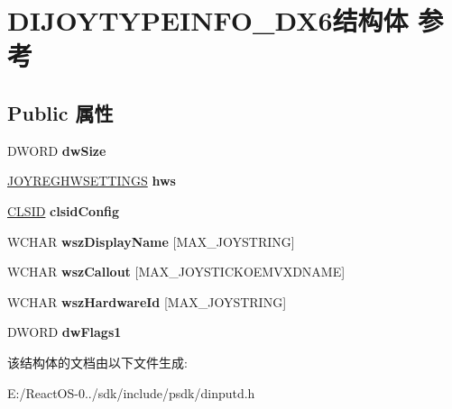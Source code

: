 \hypertarget{struct_d_i_j_o_y_t_y_p_e_i_n_f_o___d_x6}{}\section{D\+I\+J\+O\+Y\+T\+Y\+P\+E\+I\+N\+F\+O\+\_\+\+D\+X6结构体 参考}
\label{struct_d_i_j_o_y_t_y_p_e_i_n_f_o___d_x6}
\subsection*{Public 属性}
\begin{DoxyCompactItemize}
\item 
\mbox{\label{struct_d_i_j_o_y_t_y_p_e_i_n_f_o___d_x6_ae229e0a36d2dd83f87f8fc64b7ffb459}} 
D\+W\+O\+RD {\bfseries dw\+Size}
\item 
\mbox{\label{struct_d_i_j_o_y_t_y_p_e_i_n_f_o___d_x6_ad993c94e506e405653a9c414a33236ca}} 
\hyperlink{structjoyreghwsettings__tag}{J\+O\+Y\+R\+E\+G\+H\+W\+S\+E\+T\+T\+I\+N\+GS} {\bfseries hws}
\item 
\mbox{\label{struct_d_i_j_o_y_t_y_p_e_i_n_f_o___d_x6_ab74f22a72e6bd0fe367ef4685d42f233}} 
\hyperlink{struct___i_i_d}{C\+L\+S\+ID} {\bfseries clsid\+Config}
\item 
\mbox{\label{struct_d_i_j_o_y_t_y_p_e_i_n_f_o___d_x6_af8dfc3427eb0a619ed042b15db3b27cc}} 
W\+C\+H\+AR {\bfseries wsz\+Display\+Name} \mbox{[}M\+A\+X\+\_\+\+J\+O\+Y\+S\+T\+R\+I\+NG\mbox{]}
\item 
\mbox{\label{struct_d_i_j_o_y_t_y_p_e_i_n_f_o___d_x6_a5f6954de1b94e0d992e8fd855f5198de}} 
W\+C\+H\+AR {\bfseries wsz\+Callout} \mbox{[}M\+A\+X\+\_\+\+J\+O\+Y\+S\+T\+I\+C\+K\+O\+E\+M\+V\+X\+D\+N\+A\+ME\mbox{]}
\item 
\mbox{\label{struct_d_i_j_o_y_t_y_p_e_i_n_f_o___d_x6_a573ad203fe2a98392a220e3840fb449c}} 
W\+C\+H\+AR {\bfseries wsz\+Hardware\+Id} \mbox{[}M\+A\+X\+\_\+\+J\+O\+Y\+S\+T\+R\+I\+NG\mbox{]}
\item 
\mbox{\label{struct_d_i_j_o_y_t_y_p_e_i_n_f_o___d_x6_a7a01913323a7d53a16df5c5ea2b89400}} 
D\+W\+O\+RD {\bfseries dw\+Flags1}
\end{DoxyCompactItemize}


该结构体的文档由以下文件生成\+:\begin{DoxyCompactItemize}
\item 
E\+:/\+React\+O\+S-\/0../sdk/include/psdk/dinputd.\+h\end{DoxyCompactItemize}
